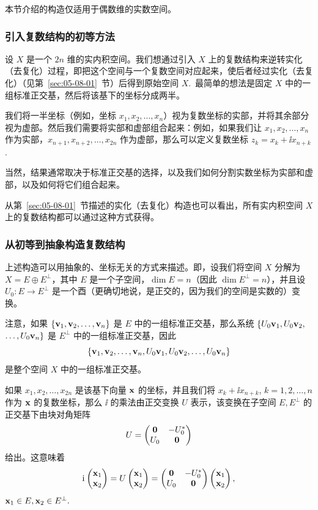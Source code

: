 本节介绍的构造仅适用于偶数维的实数空间。

\subsubsection{引入复数结构的初等方法}\label{sec:05-08-03-01}

设 $X$ 是一个 $2n$ 维的实内积空间。我们想通过引入 $X$ 上的复数结构来逆转实化（去复化）过程，即把这个空间与一个复数空间对应起来，使后者经过实化（去复化）（见第~\ref{sec:05-08-01}~节）后得到原始空间 $X$.~最简单的想法是固定 $X$ 中的一组标准正交基，然后将该基下的坐标分成两半。

我们将一半坐标（例如，坐标 $x_1, x_2, \dots, x_n$）视为复数坐标的实部，并将其余部分视为虚部。然后我们需要将实部和虚部组合起来：例如，如果我们让 $x_1, x_2, \dots, x_n$ 作为实部，$x_{n+1}, x_{n+2}, \dots, x_{2n}$ 作为虚部，那么可以定义复数坐标 $z_k = x_k + \ii x_{n+k}$.~

当然，结果通常取决于标准正交基的选择，以及我们如何分割实数坐标为实部和虚部，以及如何将它们组合起来。

从第~\ref{sec:05-08-01}~节描述的实化（去复化）构造也可以看出，所有实内积空间 $X$ 上的复数结构都可以通过这种方式获得。

\subsubsection{从初等到抽象构造复数结构}\label{sec:05-08-03-02}


上述构造可以用抽象的、坐标无关的方式来描述。即，设我们将空间 $X$ 分解为 $X = E \oplus E^\perp$，其中 $E$ 是一个子空间，$\dim E = n$（因此 $\dim E^\perp = n$），并且设 $U_0: E \to E^\perp$ 是一个酉（更确切地说，是正交的，因为我们的空间是实数的）变换。

注意，如果 $\{\mathbf{v}_1, \mathbf{v}_2, \dots, \mathbf{v}_n\}$ 是 $E$ 中的一组标准正交基，那么系统 $\{U_0 \mathbf{v}_1, U_0 \mathbf{v}_2,$ $ \dots, U_0 \mathbf{v}_n\}$ 是 $E^\perp$ 中的一组标准正交基，因此
$$\{\mathbf{v}_1, \mathbf{v}_2, \dots, \mathbf{v}_n, U_0 \mathbf{v}_1, U_0 \mathbf{v}_2, \dots, U_0 \mathbf{v}_n\}$$
是整个空间 $X$ 中的一组标准正交基。

如果 $x_1, x_2, \dots, x_{2n}$ 是该基下向量 $\mathbf{x}$ 的坐标，并且我们将 $x_k + \ii x_{n+k}$, $k=1, 2, \dots, n$ 作为 $\mathbf{x}$ 的复数坐标，那么 $\ii$ 的乘法由正交变换 $U$ 表示，该变换在子空间 $E, E^\perp$ 的正交基下由块对角矩阵
$$U = \begin{pmatrix} \mathbf{0} & -U_0^* \\ U_0 & \mathbf{0} \end{pmatrix}$$
 给出。这意味着
$$\mathrm{i}\mkern1mu \begin{pmatrix} \mathbf{x}_1 \\ \mathbf{x}_2 \end{pmatrix} = U \begin{pmatrix} \mathbf{x}_1 \\ \mathbf{x}_2 \end{pmatrix} = \begin{pmatrix} \mathbf{0} & -U_0^* \\ U_0 & \mathbf{0} \end{pmatrix} \begin{pmatrix} \mathbf{x}_1 \\ \mathbf{x}_2 \end{pmatrix},$$
$\mathbf{x}_1 \in E,  \mathbf{x}_2 \in E^\perp.$

